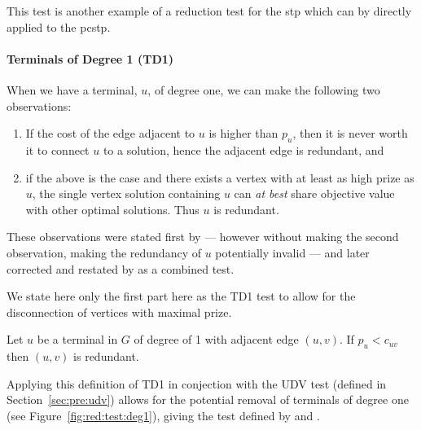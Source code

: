 This test is another example of a reduction test for the \gls{stp} which can by directly applied to
 the \gls{pcstp}.
 \paragraph{Terminals of Degree 1 (TD1)}\label{sec:pre:td1}
 When we have a terminal, $u$, of degree one, we can make the following two observations:
 \begin{enumerate}
 \item If the cost of the edge adjacent to $u$ is higher than $p_u$, then it is
   never worth it to connect $u$ to a solution, hence the adjacent edge is redundant, and
 \item if the above is the case and there exists
   a vertex with at least as high prize as $u$, the single vertex solution containing $u$
   can \textit{at best} share objective value with other optimal solutions. Thus $u$ is redundant.
 \end{enumerate}
 These observations were stated first by \citet{uchoa2006reduction} ---
 however without making the second observation,
 making the redundancy of $u$ potentially invalid
 --- and later corrected and restated by \citet{rehfeldt2016reduction} as a combined test.

 We state here only the first part here as the TD1 test to allow for the disconnection of vertices with maximal prize.
 \begin{theorem}
   Let $u$ be a terminal in $G$ of degree of 1 with adjacent edge $(u, v)$. If
   $p_u < c_{uv}$ then $(u,v)$ is redundant.
 \end{theorem}

 Applying this definition of TD1 in conjection with the UDV test (defined in Section~\ref{sec:pre:udv})
 allows for the potential removal of terminals of degree one (see Figure~\ref{fig:red:test:deg1}), giving the
  test defined by \citet{uchoa2006reduction} and \citet{rehfeldt2016reduction}.

